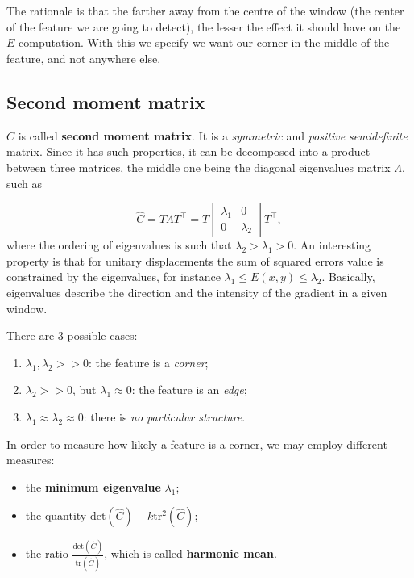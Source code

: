 \documentclass[10pt]{report}
\begin{document}
The rationale is that the farther away from the centre of the window
(the center of the feature we are going to detect), the lesser the
effect it should have on the \(E\) computation. With this we specify we
want our corner in the middle of the feature, and not anywhere else.

\subsection{Second moment matrix}
\label{second-moment-matrix}
\(\hat{C}\) is called \textbf{second moment matrix}. It is a \emph{symmetric} and
\emph{positive semidefinite} matrix. Since it has such properties, it can be
decomposed into a product between three matrices, the middle one being
the diagonal eigenvalues matrix \(\Lambda\), such as

\[\hat{C} = T \Lambda T^\top = T \begin{bmatrix} \lambda_1 & 0 \\ 0 & \lambda_2\end{bmatrix} T^\top,\]
where the ordering of eigenvalues is such that
\(\lambda_2 > \lambda_1 > 0.\) An interesting property is that for
unitary displacements the sum of squared errors value is constrained by
the eigenvalues, for instance \(\lambda_1 \leq E(x, y) \leq \lambda_2\).
Basically, eigenvalues describe the direction and the intensity of the
gradient in a given window.

There are \(3\) possible cases:

\begin{enumerate}
\item \(\lambda_1, \lambda_2 >> 0\): the feature is a \emph{corner};
\item \(\lambda_2 >> 0\), but \(\lambda_1 \approx 0\): the feature is an
\emph{edge};
\item \(\lambda_1 \approx \lambda_2 \approx 0\): there is \emph{no particular
structure}.
\end{enumerate}

In order to measure how likely a feature is a corner, we may employ
different measures:

\begin{itemize}
\item the \textbf{minimum eigenvalue} \(\lambda_1\);
\item the quantity \(\mbox{det}(\hat{C}) - k \mbox{tr}^2(\hat{C})\);
\item the ratio \(\frac{\mbox{det}(\hat{C})}{\mbox{tr}(\hat{C})}\), which is called \textbf{harmonic mean}.
\end{itemize}
\end{document}
